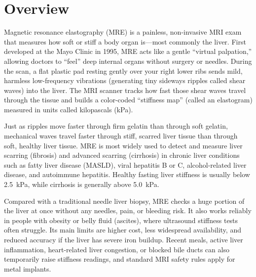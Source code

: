 \label{ch:infographic-mre}

\section{Overview}

Magnetic resonance elastography (MRE) is a painless, non-invasive MRI exam that measures how soft or stiff a body organ is---most commonly the liver. First developed at the Mayo Clinic in 1995, MRE acts like a gentle ``virtual palpation,'' allowing doctors to ``feel'' deep internal organs without surgery or needles. During the scan, a flat plastic pad resting gently over your right lower ribs sends mild, harmless low-frequency vibrations (generating tiny sideways ripples called shear waves) into the liver. The MRI scanner tracks how fast those shear waves travel through the tissue and builds a color-coded ``stiffness map'' (called an elastogram) measured in units called kilopascals (kPa).

Just as ripples move faster through firm gelatin than through soft gelatin, mechanical waves travel faster through stiff, scarred liver tissue than through soft, healthy liver tissue. MRE is most widely used to detect and measure liver scarring (fibrosis) and advanced scarring (cirrhosis) in chronic liver conditions such as fatty liver disease (MASLD), viral hepatitis B or C, alcohol-related liver disease, and autoimmune hepatitis. Healthy fasting liver stiffness is usually below 2.5~kPa, while cirrhosis is generally above 5.0~kPa.

Compared with a traditional needle liver biopsy, MRE checks a huge portion of the liver at once without any needles, pain, or bleeding risk. It also works reliably in people with obesity or belly fluid (ascites), where ultrasound stiffness tests often struggle. Its main limits are higher cost, less widespread availability, and reduced accuracy if the liver has severe iron buildup. Recent meals, active liver inflammation, heart-related liver congestion, or blocked bile ducts can also temporarily raise stiffness readings, and standard MRI safety rules apply for metal implants.

